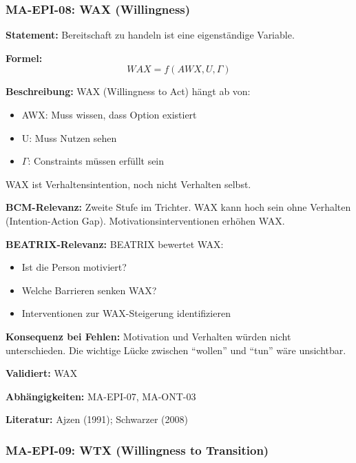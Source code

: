 \subsubsection*{MA-EPI-08: WAX (Willingness)}

\textbf{Statement:} Bereitschaft zu handeln ist eine eigenständige Variable.

\textbf{Formel:}
\begin{equation}
WAX = f(AWX, U, \Gamma)
\end{equation}

\textbf{Beschreibung:}
WAX (Willingness to Act) hängt ab von:
\begin{itemize}
    \item AWX: Muss wissen, dass Option existiert
    \item U: Muss Nutzen sehen
    \item $\Gamma$: Constraints müssen erfüllt sein
\end{itemize}
WAX ist Verhaltensintention, noch nicht Verhalten selbst.

\textbf{BCM-Relevanz:}
Zweite Stufe im Trichter. WAX kann hoch sein ohne Verhalten (Intention-Action Gap). Motivationsinterventionen erhöhen WAX.

\textbf{BEATRIX-Relevanz:}
BEATRIX bewertet WAX:
\begin{itemize}
    \item Ist die Person motiviert?
    \item Welche Barrieren senken WAX?
    \item Interventionen zur WAX-Steigerung identifizieren
\end{itemize}

\textbf{Konsequenz bei Fehlen:}
Motivation und Verhalten würden nicht unterschieden. Die wichtige Lücke zwischen ``wollen'' und ``tun'' wäre unsichtbar.

\textbf{Validiert:} WAX

\textbf{Abhängigkeiten:} MA-EPI-07, MA-ONT-03

\textbf{Literatur:} Ajzen (1991); Schwarzer (2008)


\subsubsection*{MA-EPI-09: WTX (Willingness to Transition)}

